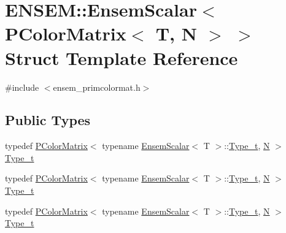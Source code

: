 \hypertarget{structENSEM_1_1EnsemScalar_3_01PColorMatrix_3_01T_00_01N_01_4_01_4}{}\section{E\+N\+S\+EM\+:\+:Ensem\+Scalar$<$ P\+Color\+Matrix$<$ T, N $>$ $>$ Struct Template Reference}
\label{structENSEM_1_1EnsemScalar_3_01PColorMatrix_3_01T_00_01N_01_4_01_4}


{\ttfamily \#include $<$ensem\+\_\+primcolormat.\+h$>$}

\subsection*{Public Types}
\begin{DoxyCompactItemize}
\item 
typedef \mbox{\hyperlink{classENSEM_1_1PColorMatrix}{P\+Color\+Matrix}}$<$ typename \mbox{\hyperlink{structENSEM_1_1EnsemScalar}{Ensem\+Scalar}}$<$ T $>$\+::\mbox{\hyperlink{structENSEM_1_1EnsemScalar_3_01PColorMatrix_3_01T_00_01N_01_4_01_4_a627b90bc6a46b2ef5b68cc55ae3f914d}{Type\+\_\+t}}, \mbox{\hyperlink{adat__devel_2lib_2hadron_2operator__name__util_8cc_a7722c8ecbb62d99aee7ce68b1752f337}{N}} $>$ \mbox{\hyperlink{structENSEM_1_1EnsemScalar_3_01PColorMatrix_3_01T_00_01N_01_4_01_4_a627b90bc6a46b2ef5b68cc55ae3f914d}{Type\+\_\+t}}
\item 
typedef \mbox{\hyperlink{classENSEM_1_1PColorMatrix}{P\+Color\+Matrix}}$<$ typename \mbox{\hyperlink{structENSEM_1_1EnsemScalar}{Ensem\+Scalar}}$<$ T $>$\+::\mbox{\hyperlink{structENSEM_1_1EnsemScalar_3_01PColorMatrix_3_01T_00_01N_01_4_01_4_a627b90bc6a46b2ef5b68cc55ae3f914d}{Type\+\_\+t}}, \mbox{\hyperlink{adat__devel_2lib_2hadron_2operator__name__util_8cc_a7722c8ecbb62d99aee7ce68b1752f337}{N}} $>$ \mbox{\hyperlink{structENSEM_1_1EnsemScalar_3_01PColorMatrix_3_01T_00_01N_01_4_01_4_a627b90bc6a46b2ef5b68cc55ae3f914d}{Type\+\_\+t}}
\item 
typedef \mbox{\hyperlink{classENSEM_1_1PColorMatrix}{P\+Color\+Matrix}}$<$ typename \mbox{\hyperlink{structENSEM_1_1EnsemScalar}{Ensem\+Scalar}}$<$ T $>$\+::\mbox{\hyperlink{structENSEM_1_1EnsemScalar_3_01PColorMatrix_3_01T_00_01N_01_4_01_4_a627b90bc6a46b2ef5b68cc55ae3f914d}{Type\+\_\+t}}, \mbox{\hyperlink{adat__devel_2lib_2hadron_2operator__name__util_8cc_a7722c8ecbb62d99aee7ce68b1752f337}{N}} $>$ \mbox{\hyperlink{structENSEM_1_1EnsemScalar_3_01PColorMatrix_3_01T_00_01N_01_4_01_4_a627b90bc6a46b2ef5b68cc55ae3f914d}{Type\+\_\+t}}
\end{DoxyCompactItemize}


